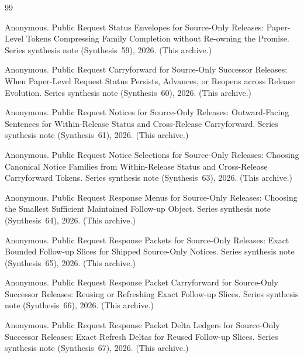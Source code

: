 \documentclass[11pt]{article}
\begin{document}
\begin{thebibliography}{99}\small

Anonymous.
\newblock Public Request Status Envelopes for Source-Only Releases: Paper-Level Tokens Compressing Family Completion without Re-owning the Promise.
\newblock Series synthesis note (Synthesis~59), 2026. (This archive.)

Anonymous.
\newblock Public Request Carryforward for Source-Only Successor Releases: When Paper-Level Request Status Persists, Advances, or Reopens across Release Evolution.
\newblock Series synthesis note (Synthesis~60), 2026. (This archive.)

Anonymous.
\newblock Public Request Notices for Source-Only Releases: Outward-Facing Sentences for Within-Release Status and Cross-Release Carryforward.
\newblock Series synthesis note (Synthesis~61), 2026. (This archive.)

Anonymous.
\newblock Public Request Notice Selections for Source-Only Releases: Choosing Canonical Notice Families from Within-Release Status and Cross-Release Carryforward Tokens.
\newblock Series synthesis note (Synthesis~63), 2026. (This archive.)

Anonymous.
\newblock Public Request Response Menus for Source-Only Releases: Choosing the Smallest Sufficient Maintained Follow-up Object.
\newblock Series synthesis note (Synthesis~64), 2026. (This archive.)

Anonymous.
\newblock Public Request Response Packets for Source-Only Releases: Exact Bounded Follow-up Slices for Shipped Source-Only Notices.
\newblock Series synthesis note (Synthesis~65), 2026. (This archive.)

Anonymous.
\newblock Public Request Response Packet Carryforward for Source-Only Successor Releases: Reusing or Refreshing Exact Follow-up Slices.
\newblock Series synthesis note (Synthesis~66), 2026. (This archive.)

Anonymous.
\newblock Public Request Response Packet Delta Ledgers for Source-Only Successor Releases: Exact Refresh Deltas for Reused Follow-up Slices.
\newblock Series synthesis note (Synthesis~67), 2026. (This archive.)


\end{thebibliography}
\end{document}
